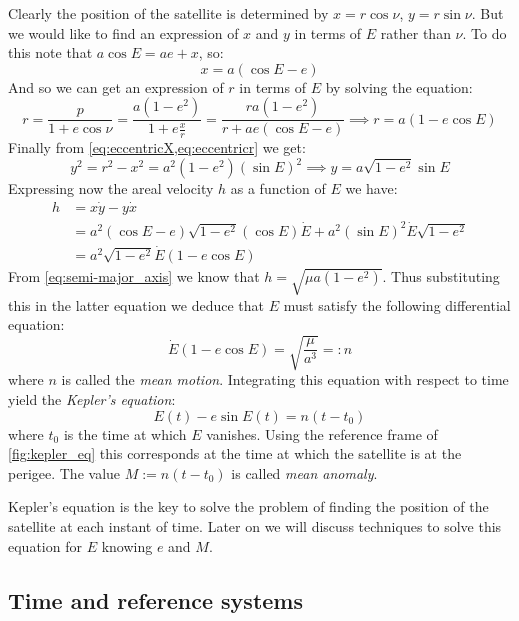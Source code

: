 \documentclass[../main.tex]{subfiles}
\begin{document}
Clearly the position of the satellite is determined by $x=r\cos\nu$, $y=r\sin\nu$. But we would like to find an expression of $x$ and $y$ in terms of $E$ rather than $\nu$. To do this note that $a\cos E=ae+x$, so:
\begin{equation}\label{eq:eccentricX}
  x=a(\cos E-e)
\end{equation}
And so we can get an expression of $r$ in terms of $E$ by solving the equation:
\begin{equation}\label{eq:eccentricr}
  r=\frac{p}{1+e\cos \nu}=\frac{a(1-e^2)}{1+e\frac{x}{r}}=\frac{ra(1-e^2)}{r+ae(\cos E-e)}\implies r= a(1-e\cos E)
\end{equation}
Finally from \cref{eq:eccentricX,eq:eccentricr} we get:
\begin{equation}
  y^2=r^2-x^2=a^2(1-e^2){(\sin E)}^2\implies y=a\sqrt{1-e^2}\sin E
\end{equation}
Expressing now the areal velocity $h$ as a function of $E$ we have:
\begin{align}
  h & =x\dot{y}-y\dot{x}                                                           \\
    & =a^2(\cos E-e)\sqrt{1-e^2}(\cos E)\dot{E}+a^2{(\sin E)}^2\dot{E}\sqrt{1-e^2} \\
    & =a^2\sqrt{1-e^2}\dot{E}(1-e\cos E)
\end{align}
From \cref{eq:semi-major_axis} we know that $h=\sqrt{\mu a(1-e^2)}$. Thus substituting this in the latter equation we deduce that $E$ must satisfy the following differential equation:
\begin{equation}
  \dot{E}(1-e\cos E)=\sqrt{\frac{\mu}{a^3}}=:n
\end{equation}
where $n$ is called the \emph{mean motion}. Integrating this equation with respect to time yield the \emph{Kepler's equation}:
\begin{equation}
  E(t)-e\sin E(t)=n(t-t_0)
\end{equation}
where $t_0$ is the time at which $E$ vanishes. Using the reference frame of \cref{fig:kepler_eq} this corresponds at the time at which the satellite is at the perigee. The value $M:=n(t-t_0)$ is called \emph{mean anomaly}.

Kepler's equation is the key to solve the problem of finding the position of the satellite at each instant of time. Later on we will discuss techniques to solve this equation for $E$ knowing $e$ and $M$.

\subsection{Time and reference systems}
\end{document}
